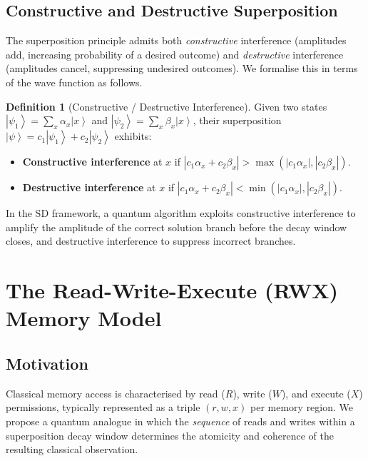 \documentclass[11pt]{article}
\theoremstyle{plain}
\theoremstyle{definition}
\newtheorem{definition}[theorem]{Definition}
\theoremstyle{remark}
\newcommand{\ket}[1]{\left| #1 \right\rangle}
\newcommand{\SD}{\ensuremath{\mathrm{SD}}}   %
\begin{document}
\subsection{Constructive and Destructive Superposition}

The superposition principle admits both \emph{constructive} interference
(amplitudes add, increasing probability of a desired outcome) and
\emph{destructive} interference (amplitudes cancel, suppressing undesired
outcomes).  We formalise this in terms of the wave function as follows.

\begin{definition}[Constructive / Destructive Interference]
  Given two states $\ket{\psi_1} = \sum_x \alpha_x \ket{x}$ and
  $\ket{\psi_2} = \sum_x \beta_x \ket{x}$, their superposition
  $\ket{\psi} = c_1 \ket{\psi_1} + c_2 \ket{\psi_2}$ exhibits:
  \begin{itemize}
    \item \textbf{Constructive interference} at $x$ if
          $|c_1 \alpha_x + c_2 \beta_x| > \max(|c_1 \alpha_x|, |c_2 \beta_x|)$.
    \item \textbf{Destructive interference} at $x$ if
          $|c_1 \alpha_x + c_2 \beta_x| < \min(|c_1 \alpha_x|, |c_2 \beta_x|)$.
  \end{itemize}
\end{definition}

In the \SD{} framework, a quantum algorithm exploits constructive interference
to amplify the amplitude of the correct solution branch before the decay
window closes, and destructive interference to suppress incorrect branches.

\section{The Read-Write-Execute (RWX) Memory Model}
\label{sec:rwx}

\subsection{Motivation}

Classical memory access is characterised by read ($R$), write ($W$), and
execute ($X$) permissions, typically represented as a triple $(r, w, x)$ per
memory region.  We propose a quantum analogue in which the \emph{sequence} of
reads and writes within a superposition decay window determines the atomicity
and coherence of the resulting classical observation.
\end{document}
